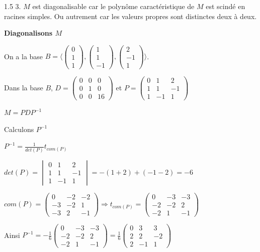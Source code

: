 \documentclass[12pt]{article}
\begin{document}
\begin{spacing}{1.5}
3. $M$ est diagonalisable car le polynôme caractéristique de $M$ est scindé en racines simples. Ou autrement car les valeurs propres sont distinctes deux à deux.

\medskip
\textbf{Diagonalisons $M$}

On a la base $B=\langle \begin{pmatrix}
0\\
1\\
1
\end{pmatrix},\begin{pmatrix}
1 \\
1 \\
-1
\end{pmatrix},\begin{pmatrix}
2 \\
-1 \\
1
\end{pmatrix}\rangle$.

Dans la base $B$, $D=\begin{pmatrix}
0 & 0 & 0 \\ 
0 & 1 & 0 \\ 
0 & 0 & 16
\end{pmatrix}$ et $P= \begin{pmatrix}
0 & 1  & 2 \\ 
1 & 1  & -1\\ 
1 & -1 & 1 
\end{pmatrix}$

$M=PDP^{-1}$

\medskip
Calculons $P^{-1}$

$P^{-1}=\frac{1}{det(P)}t_{com(P)}$

$det(P)=\begin{vmatrix}
0 & 1  & 2 \\ 
1 & 1  & -1\\ 
1 & -1 & 1 
\end{vmatrix}=-(1+2)+(-1-2)=-6$

$com(P)=\begin{pmatrix}
0 & -2  & -2 \\ 
-3 & -2  & 1\\ 
-3 & 2 & -1 
\end{pmatrix}\Rightarrow t_{com(P)}=\begin{pmatrix}
0 & -3  & -3 \\ 
-2 & -2  & 2\\ 
-2 & 1 & -1 
\end{pmatrix}$

Ainsi $P^{-1}=-\frac{1}{6}\begin{pmatrix}
0 & -3  & -3 \\ 
-2 & -2  & 2\\ 
-2 & 1 & -1 
\end{pmatrix}=\frac{1}{6}\begin{pmatrix}
0 & 3  & 3 \\ 
2 & 2  & -2\\ 
2 & -1 & 1 
\end{pmatrix}$



\end{spacing}
\end{document}
